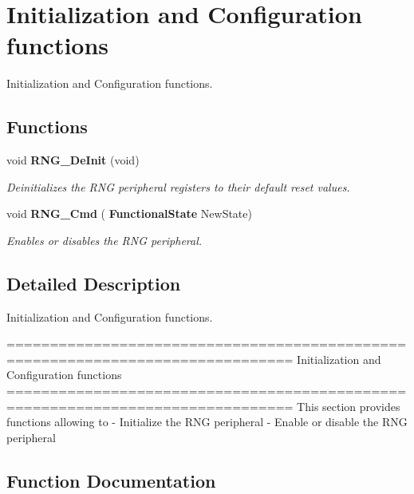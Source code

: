 \section{Initialization and Configuration functions}
\label{group__RNG__Group1}


Initialization and Configuration functions.  


\subsection*{Functions}
\begin{DoxyCompactItemize}
\item 
void \textbf{ R\+N\+G\+\_\+\+De\+Init} (void)
\begin{DoxyCompactList}\small\item\em Deinitializes the R\+NG peripheral registers to their default reset values. \end{DoxyCompactList}\item 
void \textbf{ R\+N\+G\+\_\+\+Cmd} (\textbf{ Functional\+State} New\+State)
\begin{DoxyCompactList}\small\item\em Enables or disables the R\+NG peripheral. \end{DoxyCompactList}\end{DoxyCompactItemize}


\subsection{Detailed Description}
Initialization and Configuration functions. 

\begin{DoxyVerb} ===============================================================================
                      Initialization and Configuration functions
 ===============================================================================  
  This section provides functions allowing to 
   - Initialize the RNG peripheral
   - Enable or disable the RNG peripheral\end{DoxyVerb}
 

\subsection{Function Documentation}
\mbox{\label{group__RNG__Group1_ga6c1a8372da6e8a06819903c63faecd7b}} 
